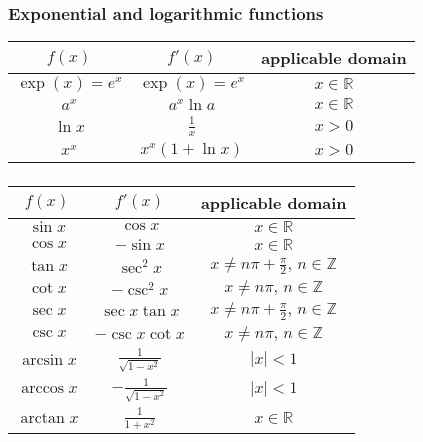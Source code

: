 \documentclass[12pt]{article}
\begin{document}
\subsubsection*{Exponential and logarithmic functions}

\begin{center}
\begin{tabular}{|c|c|c|}
\hline
$f(x)$ & $f'(x)$ & applicable domain \\
\hline\hline
$\exp(x)=e^x$ & $\exp(x)=e^x$ & $x\in \mathbb{R}$ \\
\hline
$a^x$ & $a^x\ln{a}$ & $x\in \mathbb{R}$ \\
\hline
$\ln x$ & $\displaystyle{\frac{1}{x}}$ & $x>0$ \\
\hline
$x^x$ & $x^x(1+\ln x)$ & $x>0$ \\
\hline
\end{tabular}
\end{center}

\subsubsection*{}

\begin{center}
\begin{tabular}{|c|c|c|}
\hline
$f(x)$ & $f'(x)$ & applicable domain \\
\hline\hline
$\sin{x}$ & $\cos{x}$ & $x\in \mathbb{R}$ \\
\hline
$\cos{x}$ & $-\sin{x}$ & $x\in \mathbb{R}$ \\
\hline
$\tan{x}$ & $\sec^2{x}$ & $x\ne n\pi+\displaystyle{\frac{\pi}{2}},\, n\in \mathbb{Z}$  \\
\hline
$\cot{x}$ & $-\csc^2{x}$ & $x\ne n\pi,\, n\in \mathbb{Z}$ \\
\hline
$\sec{x}$ & $\sec{x}\tan{x}$ & $x\ne n\pi+\displaystyle{\frac{\pi}{2}},\, n\in \mathbb{Z}$ \\
\hline
$\csc{x}$ & $-\csc{x}\cot{x}$ & $x\ne n\pi,\, n\in \mathbb{Z}$ \\
\hline
$\arcsin{x}$ & $\displaystyle\frac{1}{\sqrt{1-x^2}}$ & $|x|<1$ \\
\hline
$\arccos{x}$ & $\displaystyle-\frac{1}{\sqrt{1-x^2}}$ & $|x|<1$ \\
\hline
$\arctan{x}$ & $\displaystyle\frac{1}{1+x^2}$ & $x\in \mathbb{R}$ \\
\hline
\end{tabular}
\end{center}
\end{document}

